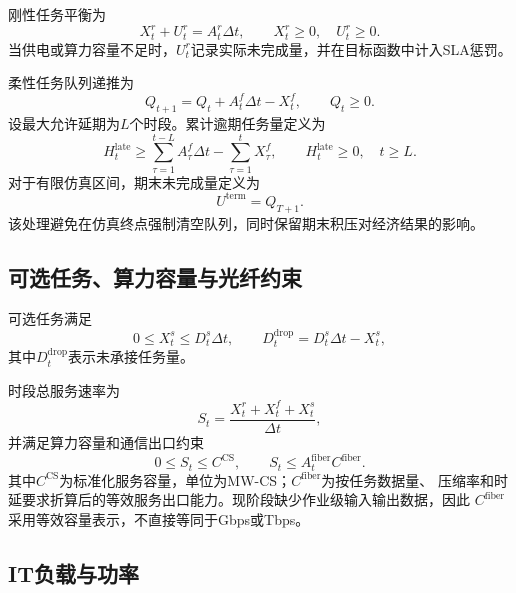 刚性任务平衡为
\begin{equation}
X_t^r+U_t^r=A_t^r\Delta t,
\qquad X_t^r\ge0,\quad U_t^r\ge0.
\label{eq:dc-rigid}
\end{equation}
当供电或算力容量不足时，$U_t^r$记录实际未完成量，并在目标函数中计入SLA惩罚。

柔性任务队列递推为
\begin{equation}
Q_{t+1}=Q_t+A_t^f\Delta t-X_t^f,
\qquad Q_t\ge0.
\label{eq:dc-queue}
\end{equation}
设最大允许延期为$L$个时段。累计逾期任务量定义为
\begin{equation}
H_t^{\mathrm{late}}
\ge
\sum_{\tau=1}^{t-L}A_\tau^f\Delta t
-\sum_{\tau=1}^{t}X_\tau^f,
\qquad
H_t^{\mathrm{late}}\ge0,
\quad t\ge L.
\label{eq:dc-overdue}
\end{equation}
对于有限仿真区间，期末未完成量定义为
\begin{equation}
U^{\mathrm{term}}=Q_{T+1}.
\label{eq:dc-terminal}
\end{equation}
该处理避免在仿真终点强制清空队列，同时保留期末积压对经济结果的影响。

\subsection{可选任务、算力容量与光纤约束}

可选任务满足
\begin{equation}
0\le X_t^s\le D_t^s\Delta t,
\qquad
D_t^{\mathrm{drop}}=D_t^s\Delta t-X_t^s,
\label{eq:dc-spot}
\end{equation}
其中$D_t^{\mathrm{drop}}$表示未承接任务量。

时段总服务速率为
\begin{equation}
S_t=\frac{X_t^r+X_t^f+X_t^s}{\Delta t},
\label{eq:dc-service-rate}
\end{equation}
并满足算力容量和通信出口约束
\begin{equation}
0\le S_t\le C^{\mathrm{CS}},
\qquad
S_t\le A_t^{\mathrm{fiber}}C^{\mathrm{fiber}}.
\label{eq:dc-capacity-fiber}
\end{equation}
其中$C^{\mathrm{CS}}$为标准化服务容量，单位为MW-CS；$C^{\mathrm{fiber}}$为按任务数据量、
压缩率和时延要求折算后的等效服务出口能力。现阶段缺少作业级输入输出数据，因此
$C^{\mathrm{fiber}}$采用等效容量表示，不直接等同于Gbps或Tbps。

\subsection{IT负载与功率}

